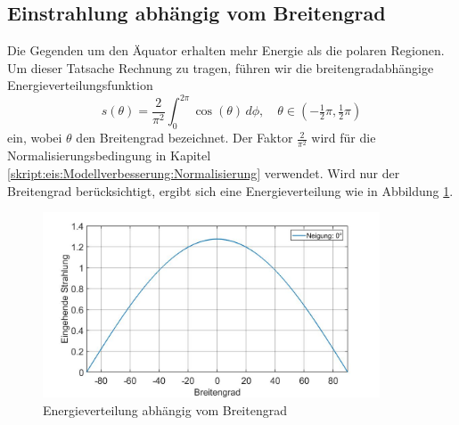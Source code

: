 \begin{refsection}
\subsection{Einstrahlung abhängig vom Breitengrad}
Die Gegenden um den Äquator erhalten mehr Energie als die polaren Regionen. Um dieser Tatsache Rechnung zu tragen, führen wir die breitengradabhängige Energieverteilungsfunktion
\begin{equation}\label{skript:eis:Energieverteilung Breitengrad}
s(\theta)
=
\frac{2}{\pi^2}\int_{0}^{2\pi}\cos(\theta)\,d\phi,\quad
\theta\in(-\tfrac{1}{2}\pi,\tfrac{1}{2}\pi)
\end{equation}
ein, wobei $\theta$ den Breitengrad bezeichnet. Der Faktor $\frac{2}{\pi^2}$ wird für die Normalisierungsbedingung in Kapitel \ref{skript:eis:Modellverbesserung:Normalisierung} verwendet. Wird nur der Breitengrad berücksichtigt, ergibt sich eine Energieverteilung wie in Abbildung \ref{skript:eis:fig:Einstrahlung_abh_vom_Breitengrad}.
\begin{figure}
 	\centering
 	\includegraphics[width=10cm]{eis/Einstrahlung_abh_vom_Breitengrad.jpg}
 	\caption{Energieverteilung abhängig vom Breitengrad}
 	\label{skript:eis:fig:Einstrahlung_abh_vom_Breitengrad}
\end{figure}

\end{refsection}
